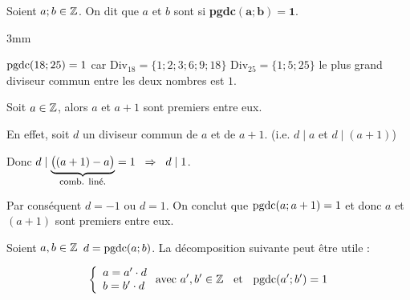 \begin{definition}
Soient $a; b \in \Z$. On dit que $a$ et $b$ sont  si \textbf{pgdc}$\bm{(a;b)=1}$.
\end{definition}




\begin{exemples}{3mm}
\item $\pgdc(18;25)=1$ car $\textrm{Div}_{18}=\{1;2;3;6;9;18\}$  $\textrm{Div}_{25}=\{1;5;25\}$  le plus grand diviseur commun entre les deux nombres est $1$.
\item Soit $a\in \Z$, alors $a$ et $a+1$ sont premiers entre eux.

En effet, soit $d$ un diviseur commun de $a$ et de $a+1$. (i.e. $d\mid a$ et $d\mid(a+1)$)

Donc $d\mid \underbrace{\big((a+1)-a\big)}_{\textrm{\footnotesize comb. liné.}}=1 \implique[2] d\mid 1$.


Par conséquent $d=-1$ ou $d=1$. On conclut que $\pgdc(a;a+1)=1$ et  donc $a$ et $(a+1)$ sont premiers entre eux.
\item Soient $a,b \in \Z$  $d=\pgdc(a;b)$. La décomposition suivante peut être utile :

\vspace{-2mm}
$$
\left\lbrace\begin{array}{l}
a=a'\cdot d\\
b=b'\cdot d
\end{array}\right. \textrm{avec $a',b'\in \Z$ \et{2} $\pgdc(a';b')=1$}
$$
\end{exemples}


\vspace{1mm}


